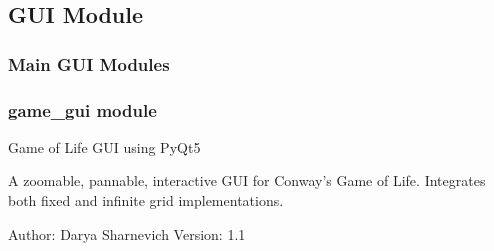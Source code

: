 \documentclass[letterpaper,10pt,oneside,english]{sphinxhowto}
\begin{document}
\sphinxstepscope


\subsection{GUI Module}
\label{\detokenize{gui:gui-module}}\label{\detokenize{gui::doc}}

\subsubsection{Main GUI Modules}
\label{\detokenize{gui:main-gui-modules}}

\subsubsection{game\_gui module}
\label{\detokenize{gui:game-gui-module}}\label{\detokenize{gui:module-gui.game_gui}}
\sphinxAtStartPar
Game of Life GUI using PyQt5

\sphinxAtStartPar
A zoomable, pannable, interactive GUI for Conway’s Game of Life.
Integrates both fixed and infinite grid implementations.

\sphinxAtStartPar
Author: Darya Sharnevich
Version: 1.1
\end{document}
